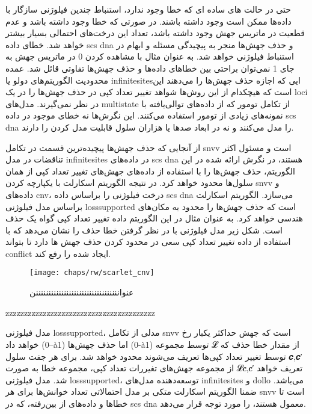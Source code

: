 حتی در حالت های ساده ای که خطا وجود ندارد، استنباط چندین فیلوژنی سازگار با داده‌ها ممکن است وجود داشته باشند. در صورتی که خطا وجود داشته باشد و عدم قطعیت در ماتریس جهش وجود داشته باشد، تعداد این درخت‌های احتمالی بسیار بیشتر خواهد شد. خطای داده \gls{scs} \gls{dna} و حذف جهش‌ها منجر به پیچیدگی مسئله و ابهام در استنباط فیلوژنی خواهد شد. به عنوان مثال با مشاهده کردن 0 در ماتریس جهش به جای 1 نمی‌توان براحتی بین خطاهای داده‌ها و حذف جهش‌ها تفاوتی قائل شد. عمده محدودیت الگوریتم‌های دولو یا \gls{infinitesites}ایی که اجازه حذف جهش‌ها را می‌دهند این است که هیچکدام از این روش‌ها شواهد تغییر تعداد کپی در حذف جهش‌ها را در یک  \gls{loci} در نظر نمی‌گیرند. مدل‌های \gls{multistate} از تکامل تومور که از داده‌های توالی‌یافته با نمونه‌های زیادی از تومور استفاده می‌کنند. این نگرش‌ها نه خطای موجود در داده \gls{scs} \gls{dna} را مدل می‌کنند و نه در ابعاد صدها یا هزاران سلول قابلیت مدل کردن را دارند. 

از آنجایی که حذف جهش‌ها پیچیده‌ترین قسمت در تکامل \gls{snvv} است و مسئول اکثر تناقضات در مدل \gls{infinitesites} در داده‌های \gls{scs} \gls{dna} هستند، در نگرش ارائه شده در این الگوریتم، حذف جهش‌ها را با  استفاده از داده‌های جهش‌های تغییر تعداد کپی از همان سلول‌ها محدود خواهد کرد. در نتیجه الگوریتم اسکارلت با یکپارچه کردن \gls{snvv} و داده‌های \gls{cnv}، درخت فیلوژنی را براساس داده \gls{scs} \gls{dna}  می‌سازد. الگوریتم اسکارلت براساس مدل فیلوژنی \gls{losssupported} است که حذف جهش‌ها را محدود به مکان‌های هندسی خواهد کرد. به عنوان مثال در این الگوریتم  داده تغییر تعداد کپی گواه یک حذف است. شکل زیر مدل فیلوژنی با در نظر گرفتن خطا حذف را نشان می‌دهد که با استفاده از داده تغییر تعداد کپی  سعی در محدود کردن حذف جهش ها دارد تا بتواند \gls{conflict} ایجاد شده را رفع کند. 

\begin{figure}[!ht]
	\centerline{\texttt{[image: chaps/rw/scarlet\_cnv]}}
	\caption{عنوانننننننننننننننننننننننننننننننننن}
	\label{fig:ch_rw:scarlet_cnv}
\end{figure}


zzzzzzzzzzzzzzzzzzzzzzzzzzzzzzzzzzzzzzzz

مدل فیلوژنی \gls{losssupported}،  مدلی از تکامل \gls{snvv} است که جهش حداکثر یکبار رخ خواهد داد (0--à1) اما حذف جهش‌ها (0-à1) توسط مجموعه
𝓛
از مقدار خطا حذف که توسط تغییر تعداد کپی‌ها تعریف می‌شوند محدود خواهد شد. برای هر جفت سلول
𝒄,𝒄′
از مجموعه جهش‌های تغیررات تعداد کپی، مجموعه خطا به صورت
𝓛𝒄,𝒄′
تعریف خواهد شد. مدل فیلوژنی \gls{losssupported}، توسعه‌دهنده مدل‌های \gls{infinitesites} و \gls{dollo} می‌باشد. ضمنا الگوریتم اسکارلت متکی بر مدل احتمالاتی تعداد خوانش‌ها برای هر \gls{snvv} است تا خطاها و داده‌های از بین‌رفته، که در  \gls{scs} \gls{dna} معمول هستند، را مورد توجه قرار می‌دهد. 


